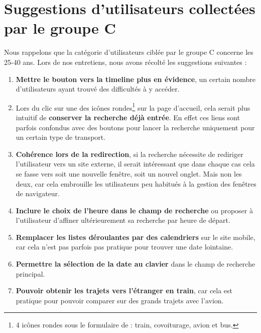 
\section{Suggestions d'utilisateurs collect\'{e}es par le groupe C}

Nous rappelons que la cat\'{e}gorie d'utilisateurs cibl\'{e}e par le groupe C concerne les 25-40 ans. Lors de nos entretiens, nous avons r\'{e}colt\'{e} les suggestions suivantes :

\begin{enumerate}

\item \textbf{Mettre le bouton vers la timeline plus en \'{e}vidence}, un certain nombre d'utilisateurs ayant trouv\'{e} des difficult\'{e}s \`{a} y acc\'{e}der.
\item Lors du clic sur une des ic\^{o}nes rondes\footnote{4 ic\^{o}nes rondes sous le formulaire de  : train, covoiturage, avion et bus.} sur la page d'accueil, cela serait plus intuitif de \textbf{conserver la recherche d\'{e}j\`{a} entr\'{e}e}. En effet ces liens sont parfois confondus avec des boutons pour lancer la recherche uniquement pour un certain type de transport.
\item \textbf{Coh\'{e}rence lors de la redirection}, si la recherche n\'{e}cessite de rediriger l'utilisateur vers un site externe, il serait int\'{e}ressant que dans chaque cas cela se fasse vers soit une nouvelle fen\^{e}tre, soit un nouvel onglet. Mais non les deux, car cela embrouille les utilisateurs peu habitu\'{e}s \`{a} la gestion des fen\^{e}tres de navigateur.
\item \textbf{Inclure le choix de l'heure dans le champ de recherche} ou proposer \`{a} l'utilisateur d'affiner ult\'{e}rieurement sa recherche par heure de d\'{e}part.
\item \textbf{Remplacer les listes d\'{e}roulantes par des calendriers} sur le site mobile, car cela n'est pas parfois pas pratique pour trouver une date lointaine.
\item \textbf{Permettre la s\'{e}lection de la date au clavier} dans le champ de recherche principal.
\item \textbf{Pouvoir obtenir les trajets vers l'\'{e}tranger en train}, car cela est pratique pour pouvoir comparer sur des grands trajets avec l'avion.

\end{enumerate}